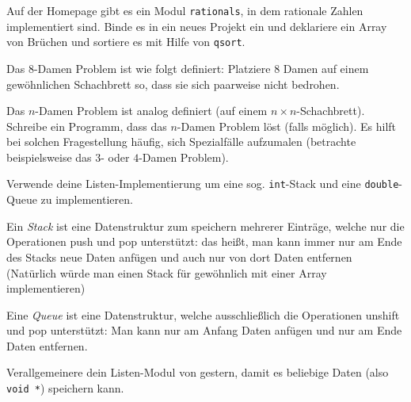 \documentclass{uebungszettel}
\begin{document}
\begin{aufg} Auf der Homepage gibt es ein Modul \verb|rationals|, in dem rationale Zahlen implementiert sind. Binde es in ein neues Projekt ein und deklariere ein Array von Brüchen und sortiere es mit Hilfe von \verb|qsort|.
\end{aufg}

\begin{aufg}
Das $8$-Damen Problem ist wie folgt definiert: Platziere $8$ Damen auf einem gewöhnlichen Schachbrett so, dass sie sich paarweise nicht bedrohen.

Das $n$-Damen Problem ist analog definiert (auf einem $n \times n$-Schachbrett). Schreibe ein Programm, dass das $n$-Damen Problem löst (falls möglich). Es hilft bei solchen Fragestellung häufig, sich Spezialfälle aufzumalen (betrachte beispielsweise das $3$- oder $4$-Damen Problem). 
\end{aufg}

\begin{aufg}
Verwende deine Listen-Implementierung um eine sog. \verb|int|-Stack und eine \verb|double|-Queue zu implementieren.

Ein \emph{Stack} ist eine Datenstruktur zum speichern mehrerer Einträge, welche nur die Operationen push und pop unterstützt: das heißt, man kann immer nur am Ende des Stacks neue Daten anfügen und auch nur von dort Daten entfernen (Natürlich würde man einen Stack für gewöhnlich mit einer Array implementieren)

Eine \emph{Queue} ist eine Datenstruktur, welche ausschließlich die Operationen unshift und pop unterstützt: Man kann nur am Anfang Daten anfügen und nur am Ende Daten entfernen.

\end{aufg}

\begin{aufg} Verallgemeinere dein Listen-Modul von gestern, damit es beliebige Daten (also \verb|void *|) speichern kann.
\end{aufg}
\end{document}
